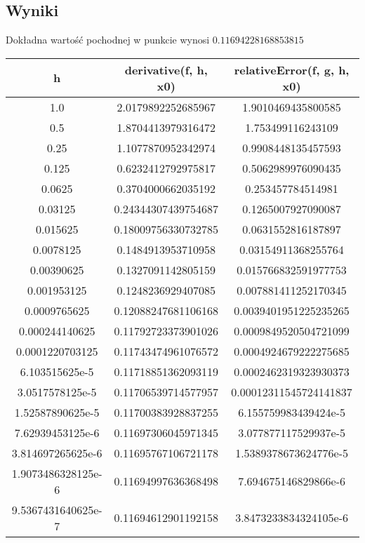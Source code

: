 \documentclass{article}
\begin{document}
\begin{center}
    \subsection{Wyniki}
     \large Dokładna wartość pochodnej w punkcie wynosi \(0.11694228168853815\)
     \newpage
     \begin{table}[h!]
     \centering
     \begin{tabular}{||c c c||} 
     \hline
     \textbf{h} & \textbf{derivative(f, h, x0)} & \textbf{relativeError(f, g, h, x0)}  \\ [0.5ex]
     \hline\hline
     1.0 & 2.0179892252685967 & 1.9010469435800585 \\ 
     0.5 & 1.8704413979316472 & 1.753499116243109 \\
     0.25 & 1.1077870952342974 & 0.9908448135457593 \\ 
     0.125 & 0.6232412792975817 & 0.5062989976090435 \\ 
     0.0625 & 0.3704000662035192 & 0.253457784514981 \\ 
     0.03125 & 0.24344307439754687 & 0.1265007927090087 \\ 
     0.015625 & 0.18009756330732785 & 0.0631552816187897 \\ 
     0.0078125 & 0.1484913953710958 & 0.03154911368255764 \\ 
     0.00390625 & 0.1327091142805159 & 0.015766832591977753 \\ 
     0.001953125 &  0.1248236929407085 & 0.007881411252170345 \\ 
     0.0009765625 & 0.12088247681106168 & 0.0039401951225235265 \\ 
     0.000244140625 &  0.11792723373901026 & 0.0009849520504721099 \\ 
     0.0001220703125 & 0.11743474961076572 & 0.0004924679222275685 \\ 
     6.103515625e-5 & 0.11718851362093119 & 0.0002462319323930373 \\ 
     3.0517578125e-5 & 0.11706539714577957 & 0.00012311545724141837 \\ 
     1.52587890625e-5 & 0.11700383928837255 & 6.155759983439424e-5\\ 
     7.62939453125e-6 & 0.11697306045971345 & 3.077877117529937e-5 \\ 
     3.814697265625e-6 & 0.11695767106721178 & 1.5389378673624776e-5 \\ 
     1.9073486328125e-6 & 0.11694997636368498 & 7.694675146829866e-6 \\ 
     9.5367431640625e-7 &  0.11694612901192158 & 3.8473233834324105e-6 \\ 

\end{tabular}
\end{table}
\end{center}
\end{document}
